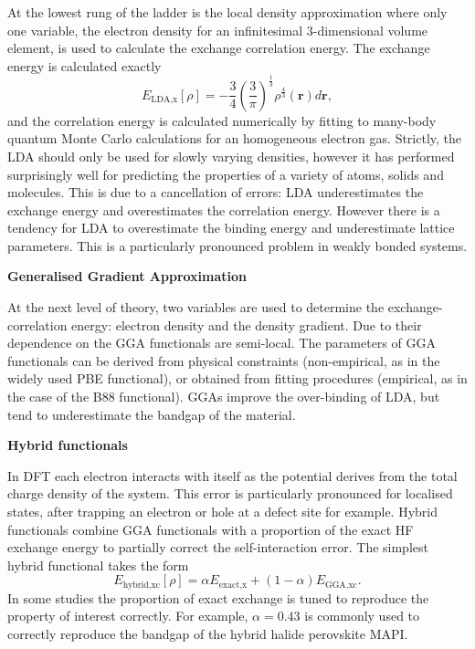 At the lowest rung of the ladder is the local density approximation where only one variable, the electron density for an infinitesimal 3-dimensional volume element, is used to calculate the exchange correlation energy. The exchange energy is calculated exactly
\begin{equation}
E_{\textrm{LDA,x}}\left[\rho\right] = {-\frac{3}{4}\left(\frac{3}{\pi}\right)^{\frac{1}{3}}\rho^{\frac{4}{3}}\left(\textbf{r}\right)d\textbf{r}},
\end{equation}
and the correlation energy is calculated numerically by fitting to many-body quantum Monte Carlo calculations for an homogeneous electron gas.\autocite{Ceperley1980} %
Strictly, the LDA should only be used for slowly varying densities, however it has performed surprisingly well for predicting the properties of a variety of atoms, solids and molecules. This is due to a cancellation of errors: LDA underestimates the exchange energy and overestimates the correlation energy.\autocite{Burke2007} However there is a tendency for LDA to overestimate the binding energy and underestimate lattice parameters. This is a particularly pronounced problem in weakly bonded systems.


\textbf{Generalised Gradient Approximation}

At the next level of theory, two variables are used to determine the exchange-correlation energy: electron density and the density gradient. Due to their dependence on the GGA functionals are semi-local. The parameters of GGA functionals can be derived from physical constraints (non-empirical, as in the widely used PBE functional), or obtained from fitting procedures (empirical, as in the case of the B88 functional). GGAs improve the over-binding of LDA, but tend to underestimate the bandgap of the material.


\textbf{Hybrid functionals} 

In DFT each electron interacts with itself as the potential derives from the total charge density of the system. This error is particularly pronounced for localised states, after trapping an electron or hole at a defect site for example. Hybrid functionals combine GGA functionals with a proportion of the exact HF exchange energy to partially correct the self-interaction error. The simplest hybrid functional takes the form
\begin{equation}
E_{\textrm{hybrid,xc}}\left[\rho\right] = \alpha E_{\textrm{exact,x}} + \left(1-\alpha\right)E_{\textrm{GGA,xc}}.
\end{equation}
In some studies the proportion of exact exchange is tuned to reproduce the property of interest correctly. For example, $\alpha=0.43$ is commonly used to correctly reproduce the bandgap of the hybrid halide perovskite MAPI. %

